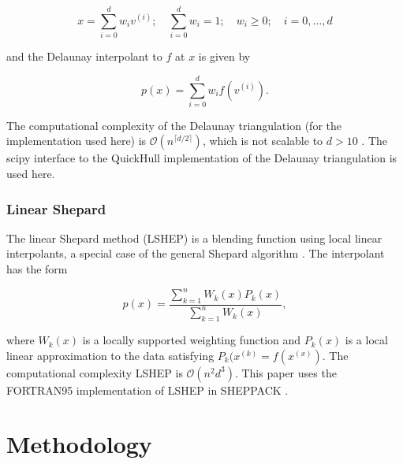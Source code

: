 \documentclass{scspaperproc}
\theoremstyle{scsthe}
\begin{document}
$$ x = \sum_{i=0}^{d} w_i v^{(i)}; \quad \sum_{i=0}^{d} w_i = 1; \quad
w_i \geq 0; \quad i=0,\ldots,d $$

and the Delaunay interpolant to $f$ at $x$ is given by

$$ p(x) = \sum_{i=0}^{d} w_i f(v^{(i)}). $$

The computational complexity of the Delaunay triangulation (for the
implementation used here) is $\mathcal{O}(n^{\lceil d/2 \rceil})$,
which is not scalable to $d > 10$ .
The scipy interface  to the QuickHull implementation
 of the Delaunay triangulation is used here.

\subsubsection{Linear Shepard}

The linear Shepard method (LSHEP) is a blending function using local
linear interpolants, a special case of the general Shepard algorithm
. The interpolant has the form

$$ p(x) = \frac{\sum_{k=1}^{n}W_k(x)P_k(x)}{\sum_{k=1}^{n}W_k(x)} ,$$

where $W_k(x)$ is a locally supported weighting function and $P_k(x)$
is a local linear approximation to the data satisfying $P_k(x^{(k)} =
f(x^{(x)})$. The computational complexity LSHEP is
$\mathcal{O}(n^2d^3)$. This paper uses the FORTRAN95 implementation of
LSHEP in SHEPPACK .


\section{Methodology}
\label{sec:methodology}
\end{document}
